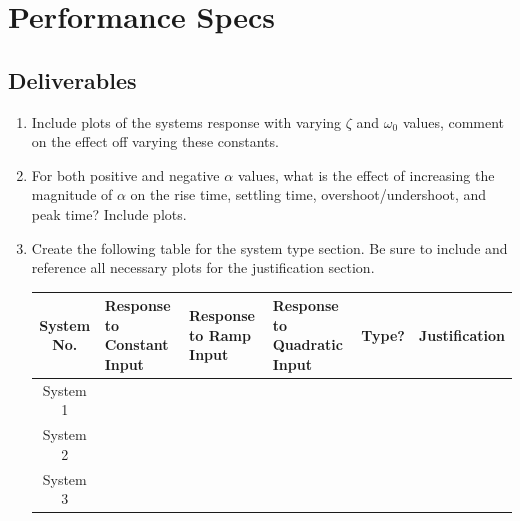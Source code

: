\documentclass[letterpaper, 11pt, openany]{book}
\begin{document}
 
\chapter{Performance Specs}
\section{Deliverables}

\begin{enumerate}
\item Include plots of the systems response with varying $\zeta$ and $\omega_0$ values, comment 
on the effect off varying these constants. 
\item For both positive and negative $\alpha$ values, what is the effect of increasing the magnitude 
of $\alpha$ on the rise time, settling time, overshoot/undershoot, and peak time? Include plots. 
\item Create the following table for the system type section. Be sure to include and reference all 
necessary plots for the justification section. 
\begin{table}[htbp]\label{tab:systype}
\centering
\begin{tabular}{|c|p{2.5cm}|p{2.5cm}|p{2.5cm}|c|c|}\hline
System No.&Response to Constant Input&Response to Ramp Input&Response to Quadratic Input&
Type?&Justification\\\hline
System 1&&&&&\\\hline
System 2&&&&&\\\hline
System 3&&&&&\\
\hline
\end{tabular}
\end{table}
\end{enumerate}
\end{document}
